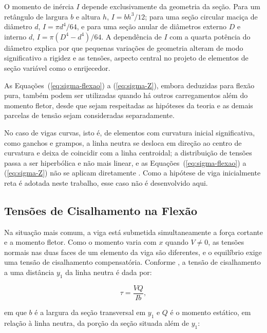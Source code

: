 \documentclass[arial,centeredequations,english,brazilian,oneside,section=TITLE]{ifes8}
\begin{document}
O momento de inércia $I$ depende exclusivamente da geometria da seção. Para um
retângulo de largura $b$ e altura $h$, $I = b h^3/12$; para
uma seção circular maciça de diâmetro $d$, $I = \pi d^4/64$, e para uma seção
anular de diâmetros externo $D$ e interno $d$, $I = \pi (D^4 - d^4)/64$. A dependência
de $I$ com a quarta potência do diâmetro explica por que pequenas variações de
geometria alteram de modo significativo a rigidez e as tensões, aspecto central no
projeto de elementos de seção variável como o enrijecedor.

As Equações~(\ref{eq:sigma-flexao}) a (\ref{eq:sigma-Z}), embora deduzidas para
flexão pura, também podem ser utilizadas quando há outros carregamentos além do
momento fletor, desde que sejam respeitadas as hipóteses da teoria e
as demais parcelas de tensão sejam consideradas separadamente.

No caso de vigas curvas, isto é, de elementos com curvatura inicial significativa,
como ganchos e grampos, a linha neutra se desloca em direção ao centro de curvatura
e deixa de coincidir com a linha centroidal; a distribuição de tensões passa a ser
hiperbólica e não mais linear, e as Equações~(\ref{eq:sigma-flexao}) a
(\ref{eq:sigma-Z}) não se aplicam diretamente \cite{Norton2013}.
Como a hipótese de viga inicialmente reta é adotada neste trabalho, esse caso não é
desenvolvido aqui.

\subsection{Tensões de Cisalhamento na Flexão}
\label{sub:cisalhamento-flexao}

Na situação mais comum, a viga está submetida simultaneamente a força cortante e a
momento fletor. Como o momento varia com $x$ quando $V \neq 0$, as tensões normais nas
duas faces de um elemento da viga são diferentes, e o equilíbrio exige uma tensão de
cisalhamento compensatória. Conforme , a tensão de cisalhamento
a uma distância $y_1$ da linha neutra é dada por:

\begin{equation}
  \label{eq:tau-flexao}
  \tau = \frac{V Q}{I b},
\end{equation}

em que $b$ é a largura da seção transversal em $y_1$ e $Q$ é o momento estático, em
relação à linha neutra, da porção da seção situada além de $y_1$:
\end{document}
